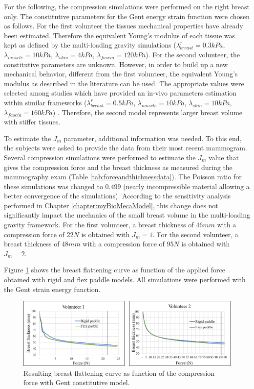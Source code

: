 For the following, the compression simulations were performed on the right breast only. The constitutive parameters for the Gent energy strain function were chosen as follows. For the first volunteer the tissues mechanical properties have already been estimated. Therefore the equivalent Young's modulus of each tissue was kept as defined by the multi-loading gravity simulations ($\lambda_{breast}^r=0.3 kPa$, $\lambda_{muscle}= 10kPa$, $\lambda_{skin}=4 kPa$, $\lambda_{fascia}=120 kPa$). For the second volunteer, the constitutive parameters are unknown. However, in order to build up a new mechanical behavior, different from the first volunteer, the equivalent Young's modulus as described in the literature can be used. The appropriate values were selected among studies which have provided an in-vivo parameters estimation within similar frameworks  ($\lambda_{breast}^r=0.5 kPa$, $\lambda_{muscle}= 10kPa$, $\lambda_{skin}=10kPa$, $\lambda_{fascia}= 160kPa$) \citep{han_nonlinear_2014, rajagopal_modelling_2007, gefen_mechanics_2007}. Therefore, the second model represents larger breast volume with stiffer tissues.  

To estimate the $J_m$ parameter, additional information was needed. To this end, the subjects were asked to provide the data from their most recent mammogram. Several compression simulations were performed to estimate the $J_m$ value that gives the compression force and the breast thickness as measured during the mammography exam (Table \ref{tab:forceandthichnessdata}). The Poisson ratio for these simulations was changed to $0.499$ (nearly incompressible material allowing a better convergence of the simulations). According to the sensitivity analysis performed in Chapter \ref{chapter:myBioMecaModel}, this change does not significantly impact the mechanics of the small breast volume in the multi-loading gravity framework. For the first volunteer, a breast thickness of $46mm$ with a compression force of $22N$ is obtained with  $J_m = 1$. For the second volunteer, a breast thickness of $48mm$ with a compression force of $95N$ is obtained with $J_m = 2$. 

Figure \ref{fig:forceThicknessResults} shows the breast flattening curve as function of the applied force obtained with rigid and flex paddle models. All simulations were performed with the Gent strain energy function. 

\begin{figure}[!h]
\centering
\includegraphics[width=1\textwidth,keepaspectratio]{figures/forceThicknessResults.png} 
\caption{Resulting breast flattening curve as function of the compression force with Gent constitutive model. }\label{fig:forceThicknessResults}
\end{figure}
    
